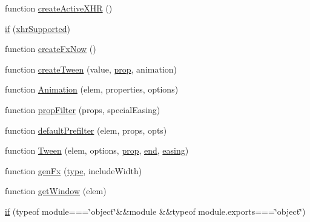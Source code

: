 \begin{DoxyCompactItemize}
\item 
function \hyperlink{_bibabook_2_scripts_2jquery-1_810_82_8js_a54bf63f1b5f905292db45a1d6a9dc300}{create\+Active\+X\+H\+R} ()
\item 
\hyperlink{_bibabook_2_scripts_2jquery-1_810_82_8js_ae2dd433d7bb020adf83db5351a0671e1}{if} (\hyperlink{packages_2j_query_81_810_82_2_content_2_scripts_2jquery-1_810_82_8js_afd7e72f2f357a5a8b17e46776a6283eb}{xhr\+Supported})
\item 
function \hyperlink{_bibabook_2_scripts_2jquery-1_810_82_8js_a3c7bcef859b0811abb1dbf890c6cc635}{create\+Fx\+Now} ()
\item 
function \hyperlink{_bibabook_2_scripts_2jquery-1_810_82_8js_a0c2043fcd2fa684768877127fbbc2e55}{create\+Tween} (value, \hyperlink{jquery-1_810_82-vsdoc_8js_af17be84954030af6c2286f5da385d41b}{prop}, animation)
\item 
function \hyperlink{_bibabook_2_scripts_2jquery-1_810_82_8js_aa33f7dcb8ee41587d545a0bc69849296}{Animation} (elem, properties, options)
\item 
function \hyperlink{_bibabook_2_scripts_2jquery-1_810_82_8js_a0196d1f08ae60b747901b5a2950f72f1}{prop\+Filter} (props, special\+Easing)
\item 
function \hyperlink{_bibabook_2_scripts_2jquery-1_810_82_8js_a8041b1040535dcee84ad474aaaf11dde}{default\+Prefilter} (elem, props, opts)
\item 
function \hyperlink{_bibabook_2_scripts_2jquery-1_810_82_8js_adcb517ce3709049d37bb5f5bd3811edf}{Tween} (elem, options, \hyperlink{jquery-1_810_82-vsdoc_8js_af17be84954030af6c2286f5da385d41b}{prop}, \hyperlink{jquery-1_810_82-vsdoc_8js_af2ce7c86b4e6e9d61f85745258f4ef32}{end}, \hyperlink{packages_2j_query_81_810_82_2_content_2_scripts_2jquery-1_810_82_8js_a9758a312629fa6de1744280dd6e6253b}{easing})
\item 
function \hyperlink{_bibabook_2_scripts_2jquery-1_810_82_8js_a0dad9ae6c57fd32a071de202faa87081}{gen\+Fx} (\hyperlink{jquery-1_810_82-vsdoc_8js_a3940565e83a9bfd10d95ffd27536da91}{type}, include\+Width)
\item 
function \hyperlink{_bibabook_2_scripts_2jquery-1_810_82_8js_ab8e6e1fb3b8b51b6afe437c63df0e09f}{get\+Window} (elem)
\item 
\hyperlink{_bibabook_2_scripts_2jquery-1_810_82_8js_aa2cebb51f03a2e3ab2af45a3f9241c96}{if} (typeof module===\char`\"{}object\char`\"{}\&\&module \&\&typeof module.\+exports===\char`\"{}object\char`\"{})
\end{DoxyCompactItemize}
